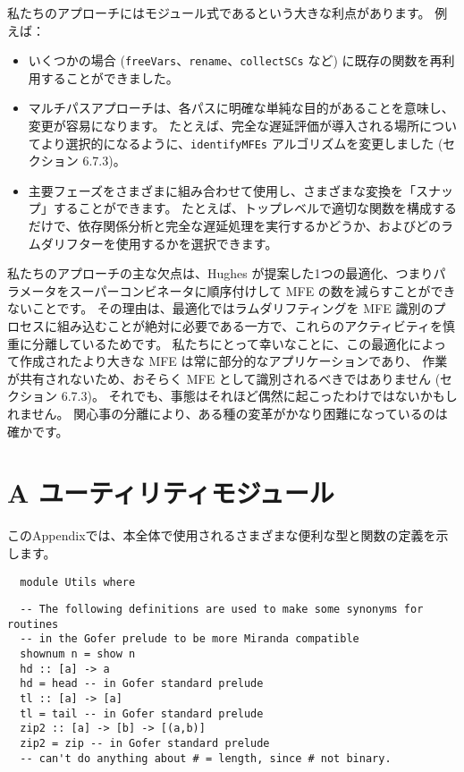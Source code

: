 \documentclass{jarticle}
\begin{document}
私たちのアプローチにはモジュール式であるという大きな利点があります。
例えば：

\begin{itemize}
	\item いくつかの場合 (\texttt{freeVars}、\texttt{rename}、\texttt{collectSCs} など) に既存の関数を再利用することができました。
	\item マルチパスアプローチは、各パスに明確な単純な目的があることを意味し、変更が容易になります。
	      たとえば、完全な遅延評価が導入される場所についてより選択的になるように、\texttt{identifyMFEs} アルゴリズムを変更しました (セクション 6.7.3)。
	\item 主要フェーズをさまざまに組み合わせて使用し、さまざまな変換を「スナップ」することができます。
	      たとえば、トップレベルで適切な関数を構成するだけで、依存関係分析と完全な遅延処理を実行するかどうか、およびどのラムダリフターを使用するかを選択できます。
\end{itemize}

私たちのアプローチの主な欠点は、Hughes が提案した1つの最適化、つまりパラメータをスーパーコンビネータに順序付けして MFE の数を減らすことができないことです。
その理由は、最適化ではラムダリフティングを MFE 識別のプロセスに組み込むことが絶対に必要である一方で、これらのアクティビティを慎重に分離しているためです。
私たちにとって幸いなことに、この最適化によって作成されたより大きな MFE は常に部分的なアプリケーションであり、
作業が共有されないため、おそらく MFE として識別されるべきではありません (セクション 6.7.3)。
それでも、事態はそれほど偶然に起こったわけではないかもしれません。
関心事の分離により、ある種の変革がかなり困難になっているのは確かです。
\newpage

\section{A ユーティリティモジュール}

このAppendixでは、本全体で使用されるさまざまな便利な型と関数の定義を示します。

\begin{verbatim}
  module Utils where
\end{verbatim}

\begin{verbatim}
  -- The following definitions are used to make some synonyms for routines
  -- in the Gofer prelude to be more Miranda compatible
  shownum n = show n
  hd :: [a] -> a
  hd = head -- in Gofer standard prelude
  tl :: [a] -> [a]
  tl = tail -- in Gofer standard prelude
  zip2 :: [a] -> [b] -> [(a,b)]
  zip2 = zip -- in Gofer standard prelude
  -- can't do anything about # = length, since # not binary.
\end{verbatim}
\end{document}
